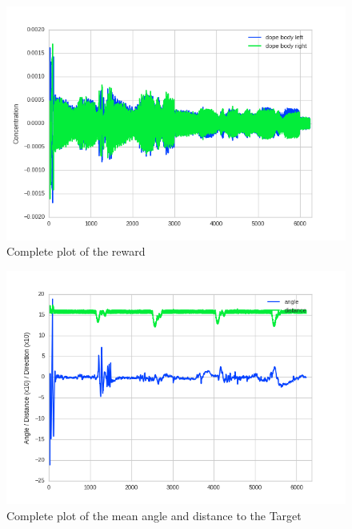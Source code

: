 \begin{figure}[htpb]
  \centering
  \includegraphics[width=\textwidth]{figures/plots/newPlots/base1Training_reward}%
  \caption{ Complete plot of the reward }
  \label{fig:dopeBase1}
\end{figure}
\begin{figure}[htpb]
  \centering
  \includegraphics[width=\textwidth]{figures/plots/newPlots/base1Training_perf}%
  \caption{ Complete plot of the mean angle and distance to the Target }
  \label{fig:angleBase1}
\end{figure}
